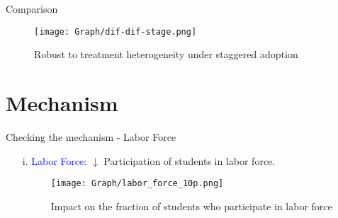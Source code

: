 \documentclass[9pt]{beamer}
\begin{document}
\begin{frame}{Comparison}
    \begin{figure}
        \centering
        \texttt{[image: Graph/dif-dif-stage.png]}
        \caption{Robust to treatment heterogeneity under staggered adoption}
        \label{fig:enter-label}
    \end{figure}
\end{frame}
\section{Mechanism}
\begin{frame}{Checking the mechanism - Labor Force}
            \begin{itemize}  
            \item[i. ] \textcolor{blue}{Labor Force:} \textcolor{blue}{$\downarrow$}  Participation of students in labor force.
            \begin{center} 
     \begin{figure}[H]
         \centering
         \texttt{[image: Graph/labor\_force\_10p.png]}
         \caption{Impact on the fraction of students who participate in labor force }
         \label{fig:labor_force_10p}
     \end{figure}
\end{center}  
        \end{itemize} \\~\\
\end{frame}
\end{document}
